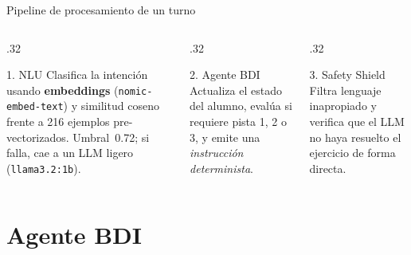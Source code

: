 \documentclass[aspectratio=169, 10pt]{beamer}
\newcommand{\tech}[1]{\texttt{\footnotesize #1}}
\begin{document}
\begin{frame}{Pipeline de procesamiento de un turno}
  \vspace{6pt}
  \begin{columns}[T]
    \begin{column}{.32\textwidth}
      \begin{block}{1. NLU}
        \footnotesize
        Clasifica la intención usando \textbf{embeddings} (\tech{nomic-embed-text}) y
        similitud coseno frente a 216 ejemplos pre-vectorizados. Umbral~0.72;
        si falla, cae a un LLM ligero (\tech{llama3.2:1b}).
      \end{block}
    \end{column}
    \begin{column}{.32\textwidth}
      \begin{block}{2. Agente BDI}
        \footnotesize
        Actualiza el estado del alumno, evalúa si requiere pista 1, 2 o 3, y emite una \textit{instrucción determinista}.
      \end{block}
    \end{column}
    \begin{column}{.32\textwidth}
      \begin{block}{3. Safety Shield}
        \footnotesize
        Filtra lenguaje inapropiado y verifica que el LLM no haya resuelto el ejercicio de forma directa.
      \end{block}
    \end{column}
  \end{columns}
\end{frame}

\section{Agente BDI}
\end{document}
